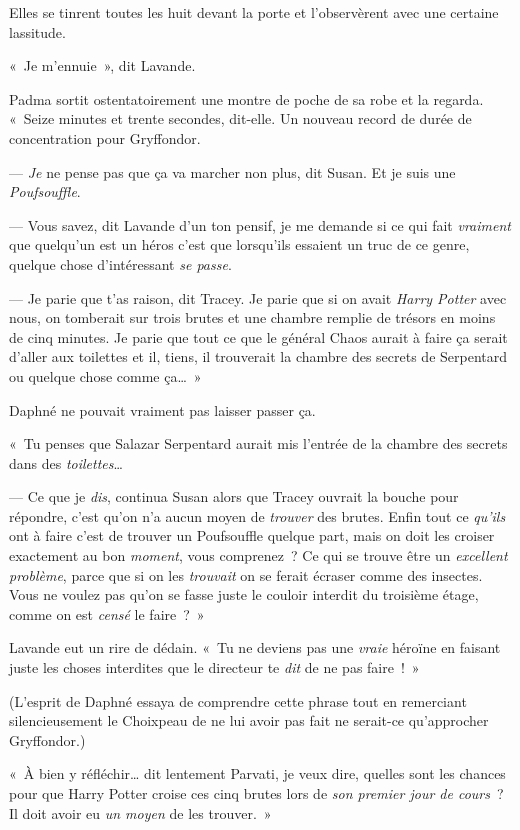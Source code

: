 Elles se tinrent toutes les huit devant la porte et l'observèrent avec une certaine lassitude.

«~Je m'ennuie~», dit Lavande.

Padma sortit ostentatoirement une montre de poche de sa robe et la regarda. «~Seize minutes et trente secondes, dit-elle. Un nouveau record de durée de concentration pour Gryffondor.

--- \emph{Je} ne pense pas que ça va marcher non plus, dit Susan. Et je suis une \emph{Poufsouffle}.

--- Vous savez, dit Lavande d'un ton pensif, je me demande si ce qui fait \emph{vraiment} que quelqu'un est un héros c'est que lorsqu'ils essaient un truc de ce genre, quelque chose d'intéressant \emph{se passe}.

--- Je parie que t'as raison, dit Tracey. Je parie que si on avait \emph{Harry Potter} avec nous, on tomberait sur trois brutes et une chambre remplie de trésors en moins de cinq minutes. Je parie que tout ce que le général Chaos aurait à faire ça serait d'aller aux toilettes et il, tiens, il trouverait la chambre des secrets de Serpentard ou quelque chose comme ça…~»

Daphné ne pouvait vraiment pas laisser passer ça.

«~Tu penses que Salazar Serpentard aurait mis l'entrée de la chambre des secrets dans des \emph{toilettes}…

--- Ce que je \emph{dis}, continua Susan alors que Tracey ouvrait la bouche pour répondre, c'est qu'on n'a aucun moyen de \emph{trouver} des brutes. Enfin tout ce \emph{qu'ils} ont à faire c'est de trouver un Poufsouffle quelque part, mais on doit les croiser exactement au bon \emph{moment}, vous comprenez~? Ce qui se trouve être un \emph{excellent problème}, parce que si on les \emph{trouvait} on se ferait écraser comme des insectes. Vous ne voulez pas qu'on se fasse juste le couloir interdit du troisième étage, comme on est \emph{censé} le faire~?~»

Lavande eut un rire de dédain. «~Tu ne deviens pas une \emph{vraie} héroïne en faisant juste les choses interdites que le directeur te \emph{dit} de ne pas faire~!~»

(L'esprit de Daphné essaya de comprendre cette phrase tout en remerciant silencieusement le Choixpeau de ne lui avoir pas fait ne serait-ce qu'approcher Gryffondor.)

«~À bien y réfléchir… dit lentement Parvati, je veux dire, quelles sont les chances pour que Harry Potter croise ces cinq brutes lors de \emph{son premier jour de cours}~? Il doit avoir eu \emph{un moyen} de les trouver.~»

